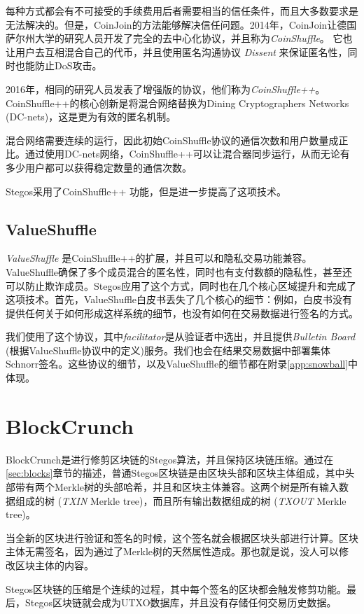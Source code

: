 \documentclass[8pt,fleqn,openany]{book}
\begin{document}
\begin{CJK*}{UTF8}{gbsn}
每种方式都会有不可接受的手续费用后者需要相当的信任条件，而且大多数要求是无法解决的。但是，CoinJoin的方法能够解决信任问题。2014年，CoinJoin让德国萨尔州大学的研究人员开发了完全的去中心化协议，并且称为\textit{CoinShuffle}\cite{c17}。 它也让用户去互相混合自己的代币，并且使用匿名沟通协议 \textit{Dissent} 来保证匿名性，同时也能防止DoS攻击。

2016年，相同的研究人员发表了增强版的协议，他们称为\textit{CoinShuffle++}\cite{c18}。CoinShuffle++的核心创新是将混合网络替换为Dining Cryptographers Networks (DC-nets)\cite{c20}，这是更为有效的匿名机制。

混合网络需要连续的运行，因此初始CoinShuffle协议的通信次数和用户数量成正比。通过使用DC-nets网络，CoinShuffle++可以让混合器同步运行，从而无论有多少用户都可以获得稳定数量的通信次数。

Stegos采用了CoinShuffle++ 功能，但是进一步提高了这项技术。

\subsection{ValueShuffle}
\textit{ValueShuffle}\cite{c19} 是CoinShuffle++的扩展，并且可以和隐私交易功能兼容。ValueShuffle确保了多个成员混合的匿名性，同时也有支付数额的隐私性，甚至还可以防止欺诈成员。Stegos应用了这个方式，同时也在几个核心区域提升和完成了这项技术。首先，ValueShuffle白皮书丢失了几个核心的细节：例如，白皮书没有提供任何关于如何形成这样系统的细节，也没有如何在交易数据进行签名的方式。

我们使用了这个协议，其中\textit{facilitator}是从验证者中选出，并且提供\textit{Bulletin Board} (根据ValueShuffle协议中的定义)服务。我们也会在结果交易数据中部署集体Schnorr签名\cite{c22}。这些协议的细节，以及ValueShuffle的细节都在附录\ref{app:snowball}中体现。

\section{BlockCrunch}\label{sec:pruning}
BlockCrunch是进行修剪区块链的Stegos算法，并且保持区块链压缩。通过在\ref{sec:blocks}章节的描述，普通Stegos区块链是由区块头部和区块主体组成，其中头部带有两个Merkle树的头部哈希，并且和区块主体兼容。这两个树是所有输入数据组成的树 (\textit{TXIN} Merkle tree)，而且所有输出数据组成的树 (\textit{TXOUT} Merkle tree)。

当全新的区块进行验证和签名的时候，这个签名就会根据区块头部进行计算。区块主体无需签名，因为通过了Merkle树的天然属性造成。那也就是说，没人可以修改区块主体的内容。

Stegos区块链的压缩是个连续的过程，其中每个签名的区块都会触发修剪功能。最后，Stegos区块链就会成为UTXO数据库，并且没有存储任何交易历史数据。


\end{CJK*}
\end{document}
